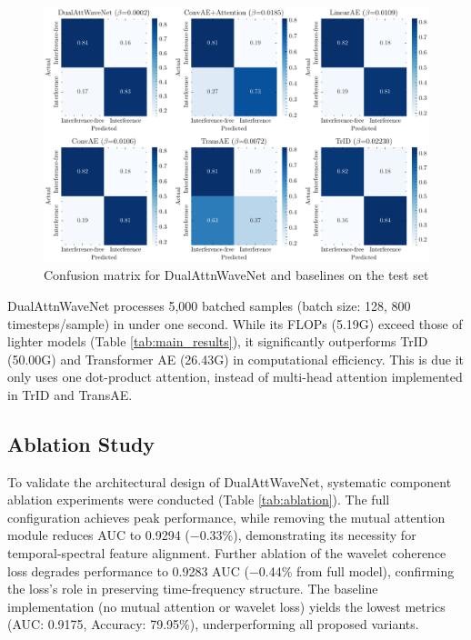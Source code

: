 \documentclass[10pt, conference]{IEEEtran}
\begin{document}
\begin{figure}[tb]
    \centering
    \includegraphics[width=\linewidth]{confusion.pdf}
    \caption{Confusion matrix for DualAttnWaveNet and baselines on the test set}
    \label{fig:confusion_matrix}
\end{figure}

DualAttnWaveNet processes 5,000 batched samples (batch size: 128, 800 timesteps/sample) in under one second. While its FLOPs (5.19G) exceed those of lighter models (Table \ref{tab:main_results}), it significantly outperforms TrID (50.00G) and Transformer AE (26.43G) in computational efficiency. This is due it only uses one dot-product attention, instead of multi-head attention implemented in TrID and TransAE. 


\subsection{Ablation Study}

To validate the architectural design of DualAttWaveNet, systematic component ablation experiments were conducted (Table \ref{tab:ablation}). The full configuration achieves peak performance, while removing the mutual attention module reduces AUC to 0.9294 (−0.33\%), demonstrating its necessity for temporal-spectral feature alignment. Further ablation of the wavelet coherence loss degrades performance to 0.9283 AUC (−0.44\% from full model), confirming the loss’s role in preserving time-frequency structure. The baseline implementation (no mutual attention or wavelet loss) yields the lowest metrics (AUC: 0.9175, Accuracy: 79.95\%), underperforming all proposed variants.
\end{document}
